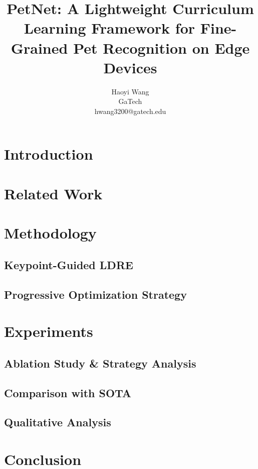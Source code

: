 \documentclass[10pt,twocolumn,letterpaper,twoside]{article}%
\title{PetNet: A Lightweight Curriculum Learning Framework for Fine-Grained Pet Recognition on Edge Devices}%
\author{Haoyi Wang \\ GaTech\\hwang3200@gatech.edu}%
\begin{document}
%
\normalsize%
\maketitle%
\begin{abstract}%
%
\end{abstract}%
\section{Introduction}%
\label{sec:Introduction}%


%
\section{Related Work}%
\label{sec:RelatedWork}%


%
\section{Methodology}%
\label{sec:Methodology}%
%
\subsection{Keypoint{-}Guided LDRE}%
\label{subsec:Keypoint{-}GuidedLDRE}%


%
\subsection{Progressive Optimization Strategy}%
\label{subsec:ProgressiveOptimizationStrategy}%


%
\section{Experiments}%
\label{sec:Experiments}%
%
\subsection{Ablation Study \& Strategy Analysis}%
\label{subsec:AblationStudyStrategyAnalysis}%


%
\subsection{Comparison with SOTA}%
\label{subsec:ComparisonwithSOTA}%


%
\subsection{Qualitative Analysis}%
\label{subsec:QualitativeAnalysis}%


%
\section{Conclusion}%
\label{sec:Conclusion}%


%
%
%
\end{document}
